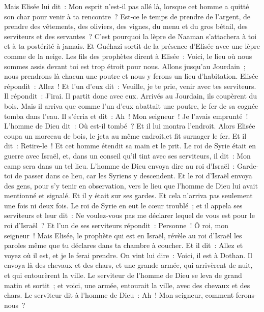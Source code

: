 \begin{multicols}{2}
Mais Elisée lui dit~: Mon esprit n'est-il pas allé là, lorsque cet homme a quitté son char pour venir à ta rencontre~? Est-ce le temps de prendre de l'argent, de prendre des vêtements, des oliviers, des vignes, du menu et du gros bétail, des serviteurs et des servantes~?
C'est pourquoi la lèpre de Naaman s'attachera à toi et à ta postérité à jamais. Et Guéhazi sortit de la présence d'Elisée avec une lèpre comme de la neige.
\VerseOne{}Les fils des prophètes dirent à Elisée~: Voici, le lieu où nous sommes assis devant toi est trop étroit pour nous.
Allons jusqu'au Jourdain~; nous prendrons là chacun une poutre et nous y ferons un lieu d'habitation. Elisée répondit~: Allez~!
Et l'un d'eux dit~: Veuille, je te prie, venir avec tes serviteurs. Il répondit~: J'irai.
Il partit donc avec eux. Arrivés au Jourdain, ils coupèrent du bois.
Mais il arriva que comme l'un d'eux abattait une poutre, le fer de sa cognée tomba dans l'eau. Il s'écria et dit~: Ah~! Mon seigneur~! Je l'avais emprunté~!
L'homme de Dieu dit~: Où est-il tombé~? Et il lui montra l'endroit. Alors Elisée coupa un morceau de bois, le jeta au même endroit,et fit surnager le fer.
Et il dit~: Retire-le~! Et cet homme étendit sa main et le prit.
Le roi de Syrie était en guerre avec Israël, et, dans un conseil qu'il tint avec ses serviteurs, il dit~: Mon camp sera dans un tel lieu.
L'homme de Dieu envoya dire au roi d'Israël~: Garde-toi de passer dans ce lieu, car les Syriens y descendent.
Et le roi d'Israël envoya des gens, pour s'y tenir en observation, vers le lieu que l'homme de Dieu lui avait mentionné et signalé. Et il y était sur ses gardes. Et cela n'arriva pas seulement une fois ni deux fois.
Le roi de Syrie en eut le cœur troublé~; et il appela ses serviteurs et leur dit~: Ne voulez-vous pas me déclarer lequel de vous est pour le roi d'Israël~?
Et l'un de ses serviteurs répondit~: Personne~! Ô roi, mon seigneur~! Mais Elisée, le prophète qui est en Israël, révèle au roi d'Israël les paroles même que tu déclares dans ta chambre à coucher.
Et il dit~: Allez et voyez où il est, et je le ferai prendre. On vint lui dire~: Voici, il est à Dothan.
Il envoya là des chevaux et des chars, et une grande armée, qui arrivèrent de nuit, et qui entourèrent la ville.
Le serviteur de l'homme de Dieu se leva de grand matin et sortit~; et voici, une armée, entourait la ville, avec des chevaux et des chars. Le serviteur dit à l'homme de Dieu~: Ah~! Mon seigneur, comment ferons-nous~?

\end{multicols}
